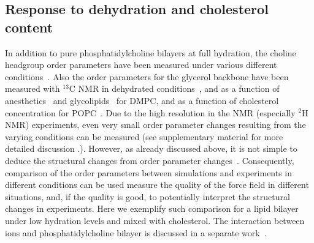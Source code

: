 \documentclass[pre,aps,floatfix,authordate1-4,twocolumn]{revtex4-1}
\begin{document}
\subsection{Response to dehydration and cholesterol content}
In addition to pure phosphatidylcholine bilayers at full hydration, the choline headgroup order parameters
have been measured under various different conditions~\cite{gally75,brown77,brown78,akutsu81,altenbach84,scherer89,bechinger91,ulrich94,dvinskikh05b,castro08,kapla12,ferreira13}.
Also the order parameters for the glycerol backbone have been measured with $^{13}$C NMR in dehydrated conditions~\cite{dvinskikh05b}, and as a function 
of anesthetics~\cite{castro08} and glycolipids~\cite{kapla12} for DMPC, and as a function of cholesterol 
concentration for POPC~\cite{ferreira13}. Due to the high resolution in the NMR (especially $^2$H NMR) experiments,
even very small order parameter changes resulting from the varying conditions can be measured (see supplementary
material for more detailed discussion .). However, as already discussed above, it is not simple to deduce 
the structural changes from order parameter changes~\cite{akutsu91,semchyschyn04}. Consequently, comparison of the order parameters
between simulations and experiments in different conditions can be used measure the quality of the force field 
in different situations, and, if the quality is good, to potentially interpret the structural changes in experiments.
Here we exemplify such comparison for a lipid bilayer under low hydration levels and mixed with cholesterol. 
The interaction between ions and phosphatidylcholine bilayer is discussed in a separate work~\cite{ionpaper}.
\end{document}
